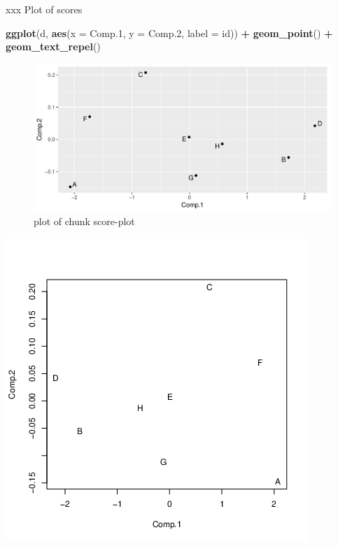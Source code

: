 \documentclass[ignorenonframetext,]{beamer}
\newenvironment{Shaded}{\begin{snugshade}}{\end{snugshade}}
\newcommand{\DataTypeTok}[1]{\textcolor[rgb]{0.13,0.29,0.53}{#1}}
\newcommand{\FloatTok}[1]{\textcolor[rgb]{0.00,0.00,0.81}{#1}}
\newcommand{\KeywordTok}[1]{\textcolor[rgb]{0.13,0.29,0.53}{\textbf{#1}}}
\newcommand{\NormalTok}[1]{#1}
\newcommand{\OperatorTok}[1]{\textcolor[rgb]{0.81,0.36,0.00}{\textbf{#1}}}
\newcommand{\StringTok}[1]{\textcolor[rgb]{0.31,0.60,0.02}{#1}}
\begin{document}
\begin{frame}[fragile]{xxx Plot of scores}
\protect\hypertarget{xxx-plot-of-scores}{}

\begin{Shaded}
\begin{Highlighting}[]
\KeywordTok{ggplot}\NormalTok{(d, }\KeywordTok{aes}\NormalTok{(}\DataTypeTok{x =}\NormalTok{ Comp}\FloatTok{.1}\NormalTok{, }\DataTypeTok{y =}\NormalTok{ Comp}\FloatTok{.2}\NormalTok{, }\DataTypeTok{label =}\NormalTok{ id)) }\OperatorTok{+}
\StringTok{  }\KeywordTok{geom_point}\NormalTok{() }\OperatorTok{+}\StringTok{ }\KeywordTok{geom_text_repel}\NormalTok{()}
\end{Highlighting}
\end{Shaded}

\begin{figure}
\centering
\includegraphics{figure/score-plot-1.pdf}
\caption{plot of chunk score-plot}
\end{figure}

\includegraphics{bPrincomp-score-plot.png}

\end{frame}
\end{document}
